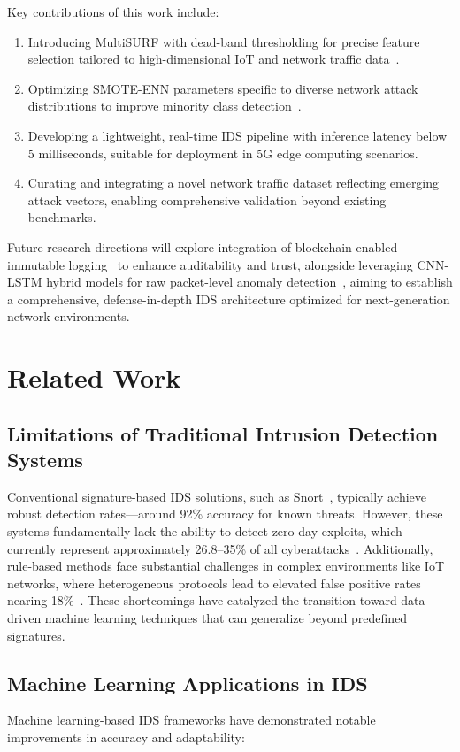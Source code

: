 \documentclass[conference]{IEEEtran}
\begin{document}
Key contributions of this work include:
\begin{enumerate}
    \item Introducing MultiSURF with dead-band thresholding for precise feature selection tailored to high-dimensional IoT and network traffic data~\cite{urbanowicz}.
    \item Optimizing SMOTE-ENN parameters specific to diverse network attack distributions to improve minority class detection~\cite{smote}.
    \item Developing a lightweight, real-time IDS pipeline with inference latency below 5 milliseconds, suitable for deployment in 5G edge computing scenarios.
    \item Curating and integrating a novel network traffic dataset reflecting emerging attack vectors, enabling comprehensive validation beyond existing benchmarks.
\end{enumerate}

Future research directions will explore integration of blockchain-enabled immutable logging~\cite{blockchain2025} to enhance auditability and trust, alongside leveraging CNN-LSTM hybrid models for raw packet-level anomaly detection~\cite{cnn2023}, aiming to establish a comprehensive, defense-in-depth IDS architecture optimized for next-generation network environments.

\section{Related Work}

\subsection{Limitations of Traditional Intrusion Detection Systems}
Conventional signature-based IDS solutions, such as Snort~\cite{snort}, typically achieve robust detection rates—around 92\% accuracy for known threats. However, these systems fundamentally lack the ability to detect zero-day exploits, which currently represent approximately 26.8--35\% of all cyberattacks~\cite{cisco}. Additionally, rule-based methods face substantial challenges in complex environments like IoT networks, where heterogeneous protocols lead to elevated false positive rates nearing 18\%~\cite{iot2023}. These shortcomings have catalyzed the transition toward data-driven machine learning techniques that can generalize beyond predefined signatures.

\subsection{Machine Learning Applications in IDS}
Machine learning-based IDS frameworks have demonstrated notable improvements in accuracy and adaptability:
\end{document}
